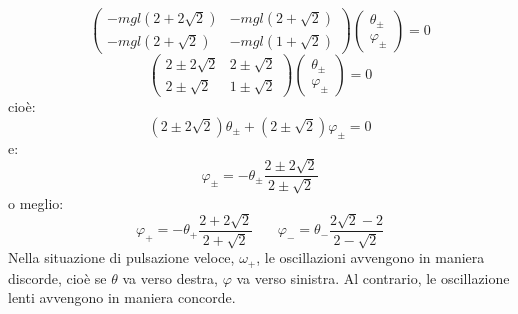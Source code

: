 \documentclass[a4paper,openany]{article}
\begin{document}
	\begin{equation*}\label{key}
		\begin{pmatrix}
			-mgl(2+2\sqrt{2}) & -mgl(2+\sqrt{2}) \\
			-mgl(2+\sqrt{2}) & -mgl(1+\sqrt{2})
		\end{pmatrix}
		\begin{pmatrix}
			\theta_{\pm} \\ \varphi_{\pm}
		\end{pmatrix} = 0
	\end{equation*}
	\begin{equation*}\label{key}
		\begin{pmatrix}
			2\pm2\sqrt{2} & 2\pm\sqrt{2} \\
			2\pm\sqrt{2} & 1\pm\sqrt{2}
		\end{pmatrix}
		\begin{pmatrix}
			\theta_{\pm} \\ \varphi_{\pm}
		\end{pmatrix} = 0
	\end{equation*}
	cioè:
	$$
	(2\pm2\sqrt{2})\theta_{\pm} + (2\pm\sqrt{2})\varphi_{\pm} = 0
	$$
	e:
	$$
	\varphi_{\pm} = -\theta_{\pm}\dfrac{2\pm2\sqrt{2}}{2\pm\sqrt{2}}
	$$
	o meglio:
	$$
	\varphi_{+} = -\theta_{+}\dfrac{2+2\sqrt{2}}{2+\sqrt{2}}  \>\>\>\>\>\>\>\> \varphi_{-} = \theta_{-}\dfrac{2\sqrt{2}-2}{2-\sqrt{2}}
	$$
	Nella situazione di pulsazione veloce, $\omega_{+}$, le oscillazioni avvengono in maniera discorde, cioè se $\theta$ va verso destra, $\varphi$ va verso sinistra. Al contrario, le oscillazione lenti avvengono in maniera concorde.
\end{document}

